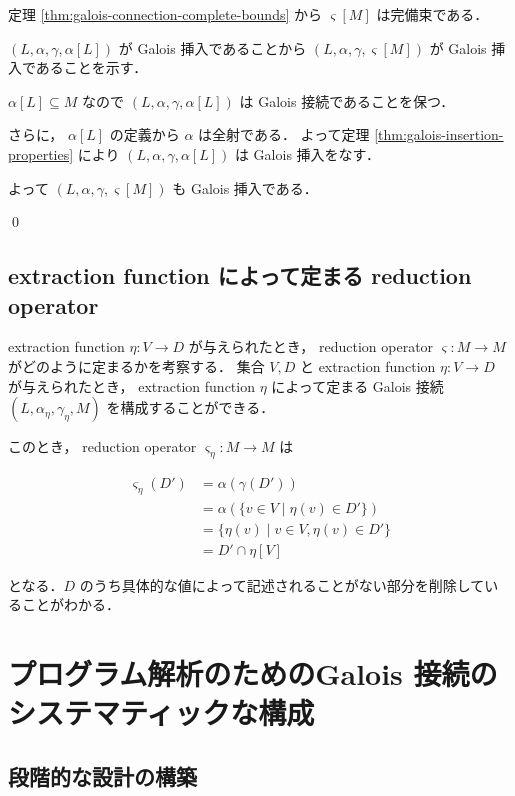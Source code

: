 \documentclass[uplatex]{jsarticle}
\begin{document}
定理 \ref{thm:galois-connection-complete-bounds} から $\varsigma [ M ]$ は完備束である．

$(L, \alpha, \gamma, \alpha[ L ])$ が Galois 挿入であることから $(L, \alpha, \gamma, \varsigma [ M ])$ が Galois 挿入であることを示す．

$\alpha[ L ] \subseteq M$ なので $(L, \alpha, \gamma, \alpha [ L ])$ は Galois 接続であることを保つ．

さらに， $\alpha [ L ]$ の定義から $\alpha$ は全射である．
よって定理 \ref{thm:galois-insertion-properties} により
$(L, \alpha, \gamma, \alpha [ L ])$ は Galois 挿入をなす．

よって $(L, \alpha, \gamma, \varsigma [ M ])$ も Galois 挿入である．

\qed

\subsection{extraction function によって定まる reduction operator}

extraction function $\eta: V \to D$ が与えられたとき， reduction operator $\varsigma: M \to M$ がどのように定まるかを考察する．
集合 $V, D$ と extraction function $\eta: V \to D$ が与えられたとき，
extraction function $\eta$ によって定まる Galois 接続 $(L, \alpha_\eta, \gamma_\eta, M)$ を構成することができる．

このとき， reduction operator $\varsigma_\eta: M \to M$ は

\begin{align*}
  \varsigma_\eta(D') & = \alpha(\gamma(D'))                                     \\
                     & = \alpha\left( \{ v \in V \mid \eta(v) \in D' \} \right) \\
                     & = \{ \eta(v) \mid v \in V, \eta(v) \in D' \}             \\
                     & = D' \cap \eta [ V ]
\end{align*}

となる．$D$ のうち具体的な値によって記述されることがない部分を削除していることがわかる．


\section{プログラム解析のためのGalois 接続のシステマティックな構成}

\subsection{段階的な設計の構築}
\end{document}
